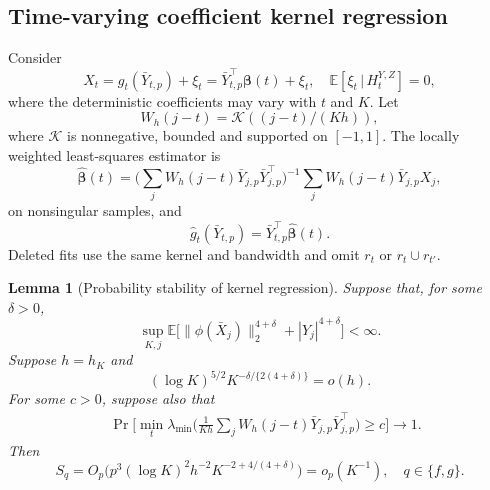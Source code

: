 \documentclass[12pt]{article}
\def\E{\mathbb{E}}
\newtheorem{lemma}[theorem]{Lemma}
\newcommand\given{\,|\,}
\numberwithin{equation}{section}
\begin{document}
\subsection{Time-varying coefficient kernel regression}
\label{app:tvcm-weighted-stability}

Consider
\[
X_t=g_t(\bar Y_{t,p})+\xi_t
   =\bar Y_{t,p}^\top\boldsymbol\beta(t)+\xi_t,
\quad
\E[\xi_t\given H_t^{Y,Z}]=0,
\]
where the deterministic coefficients may vary with $t$ and
$K$.
Let
\[
W_h(j-t)=\mathcal K((j-t)/(Kh)),
\]
where $\mathcal K$ is nonnegative, bounded and supported on
$[-1,1]$.
The locally weighted least-squares estimator is
\begin{equation}
\label{eq:tvcm-full-estimator}
\hat{\boldsymbol\beta}(t)
=
\big(
\sum_jW_h(j-t)
\bar Y_{j,p}\bar Y_{j,p}^\top
\big)^{-1}
\sum_jW_h(j-t)\bar Y_{j,p}X_j,
\end{equation}
on nonsingular samples, and
\[
\hat g_t(\bar Y_{t,p})
=
\bar Y_{t,p}^\top\hat{\boldsymbol\beta}(t).
\]
Deleted fits use the same kernel and bandwidth and omit
$r_t$ or $r_t\cup r_{t'}$.

\begin{lemma}[Probability stability of kernel regression]
\label{lem:tvcm-kernel-stability}
Suppose that, for some $\delta>0$,
\begin{equation}
\label{eq:tvcm-moment}
\sup_{K,j}
\E\big[
\|\phi(\bar X_j)\|_2^{4+\delta}
+|Y_j|^{4+\delta}
\big]<\infty.
\end{equation}
Suppose $h=h_K$ and
\begin{equation}
\label{eq:tvcm-bandwidth}
(\log K)^{5/2}
K^{-\delta/\{2(4+\delta)\}}
=o(h).
\end{equation}
For some $c>0$, suppose also that
\begin{equation}
\label{eq:tvcm-local-conditions}
\begin{aligned}
&\Pr\Big[
\min_t\lambda_{\min}\big(
\frac1{Kh}\sum_jW_h(j-t)
\bar Y_{j,p}\bar Y_{j,p}^\top
\big)\geq c
\Big]\rightarrow1.
\end{aligned}
\end{equation}
Then
\[
S_q
=
O_p\big(
p^3(\log K)^2h^{-2}
K^{-2+4/(4+\delta)}
\big)
=o_p(K^{-1}),
\quad q\in\{f,g\}.
\]
\end{lemma}
\end{document}
